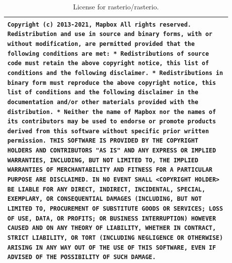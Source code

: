 \begin{table}[h]
\small
\centering
\caption{\label{tab:copyright_rasterio}
License for rasterio/rasterio.
}
\begin{tabular}{p{0.9\linewidth}}
\toprule
\texttt{Copyright (c) 2013-2021, Mapbox
All rights reserved.
\newline
Redistribution and use in source and binary forms, with or without
modification, are permitted provided that the following conditions are met:
\newline
* Redistributions of source code must retain the above copyright notice, this
  list of conditions and the following disclaimer.
\newline
* Redistributions in binary form must reproduce the above copyright notice,
  this list of conditions and the following disclaimer in the documentation
  and/or other materials provided with the distribution.
\newline
* Neither the name of Mapbox nor the names of its contributors may
  be used to endorse or promote products derived from this software without
  specific prior written permission.
\newline
THIS SOFTWARE IS PROVIDED BY THE COPYRIGHT HOLDERS AND CONTRIBUTORS "AS IS" AND
ANY EXPRESS OR IMPLIED WARRANTIES, INCLUDING, BUT NOT LIMITED TO, THE IMPLIED
WARRANTIES OF MERCHANTABILITY AND FITNESS FOR A PARTICULAR PURPOSE ARE
DISCLAIMED. IN NO EVENT SHALL <COPYRIGHT HOLDER> BE LIABLE FOR ANY DIRECT,
INDIRECT, INCIDENTAL, SPECIAL, EXEMPLARY, OR CONSEQUENTIAL DAMAGES (INCLUDING,
BUT NOT LIMITED TO, PROCUREMENT OF SUBSTITUTE GOODS OR SERVICES; LOSS OF USE,
DATA, OR PROFITS; OR BUSINESS INTERRUPTION) HOWEVER CAUSED AND ON ANY THEORY OF
LIABILITY, WHETHER IN CONTRACT, STRICT LIABILITY, OR TORT (INCLUDING NEGLIGENCE
OR OTHERWISE) ARISING IN ANY WAY OUT OF THE USE OF THIS SOFTWARE, EVEN IF
ADVISED OF THE POSSIBILITY OF SUCH DAMAGE.
} \\
\bottomrule
\end{tabular}

\vspace{-11pt}
\end{table}

